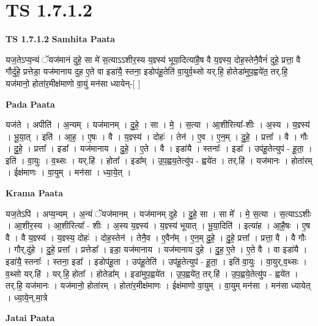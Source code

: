 \documentclass[17pt]{extarticle}
\begin{document}
\section*{ TS 1.7.1.2 }

\textbf{TS 1.7.1.2 } \newline
\textbf{Samhita Paata} \newline

यज॒तेऽप्य॒न्यं ॅयज॑मानं दुहे॒ सा मे॑ स॒त्याऽऽशीर॒स्य य॒ज्ञ्स्य॑ भूया॒दित्या॑है॒ष वै य॒ज्ञ्स्य॒ दोह॒स्तेनै॒वैनं॑ दुहे॒ प्रत्ता॒ वै गौर्दु॑हे॒ प्रत्तेडा॒ यज॑मानाय दुह ए॒ते वा इडा॑यै॒ स्तना॒ इडोप॑हू॒तेति॑ वा॒युर्व॒थ्सो यर्.हि॒ होतेडा॑मुप॒ह्वये॑त॒ तर्.हि॒ यज॑मानो॒ होता॑र॒मीक्ष॑माणो वा॒युं मन॑सा ध्यायेन्-[ ] \newline

\textbf{Pada Paata} \newline

यज॑ते । अपीति॑ । अ॒न्यम् । यज॑मानम् । दु॒हे॒ । सा । मे॒ । स॒त्या । आ॒शीरित्या᳚-शीः । अ॒स्य । य॒ज्ञ्स्य॑ । भू॒या॒त् । इति॑ । आ॒ह॒ । ए॒षः । वै । य॒ज्ञ्स्य॑ । दोहः॑ । तेन॑ । ए॒व । ए॒न॒म् । दु॒हे॒ । प्रत्ता᳚ । वै । गौः । दु॒हे॒ । प्रत्ता᳚ । इडा᳚ । यज॑मानाय । दु॒हे॒ । ए॒ते । वै । इडा॑यै । स्तनाः᳚ । इडा᳚ । उप॑हू॒तेत्युप॑ - हू॒ता॒ । इति॑ । वा॒युः । व॒थ्सः । यर्.हि॑ । होता᳚ । इडा᳚म् । उ॒प॒ह्वय॒तेत्यु॑प - ह्वये॑त । तर्.हि॑ । यज॑मानः । होता॑रम् । ईक्ष॑माणः । वा॒युम् । मन॑सा । ध्या॒ये॒त् ।  \newline


\textbf{Krama Paata} \newline

यज॒तेऽपि॑ । अप्य॒न्यम् । अ॒न्यं ॅयज॑मानम् । यज॑मानम् दुहे । दु॒हे॒ सा । सा मे᳚ । मे॒ स॒त्या । स॒त्याऽऽशीः । आ॒शीर॒स्य । आ॒शीरित्या᳚ - शीः । अ॒स्य य॒ज्ञ्स्य॑ । य॒ज्ञ्स्य॑ भूयात् । भू॒या॒दिति॑ । इत्या॑ह । आ॒है॒षः । ए॒ष वै । वै य॒ज्ञ्स्य॑ । य॒ज्ञ्स्य॒ दोहः॑ । दोह॒स्तेन॑ । तेनै॒व । ए॒वैन᳚म् । ए॒न॒म् दु॒हे॒ । दु॒हे॒ प्रत्ता᳚ । प्रत्ता॒ वै । वै गौः । गौर्,दु॑हे । दु॒हे॒ प्रत्ता᳚ । प्रत्तेडा᳚ । इडा॒ यज॑मानाय । यज॑मानाय दुहे । दु॒ह॒ ए॒ते । ए॒ते वै । वा इडा॑यै । इडा॑यै॒ स्तनाः᳚ । स्तना॒ इडा᳚ । इडोप॑हू॒ता । उप॑हू॒तेति॑ । उप॑हू॒तेत्युप॑ - हू॒ता॒ । इति॑ वा॒युः । वा॒युर्,व॒थ्सः । व॒थ्सो यर्.हि॑ । यर्.हि॒ होता᳚ । होतेडा᳚म् । इडा॑मुप॒ह्वये॑त । उ॒प॒ह्वये॑त॒ तर्.हि॑ । उ॒प॒ह्वये॒तेत्यु॑प - ह्वये॑त । तर्.हि॒ यज॑मानः । यज॑मानो॒ होता॑रम् । होता॑र॒मीक्ष॑माणः । ईक्ष॑माणो वा॒युम् । वा॒युम् मन॑सा । मन॑सा ध्यायेत् । ध्या॒ये॒न्,मा॒त्रे \newline

\textbf{Jatai Paata} \newline
\end{document}
